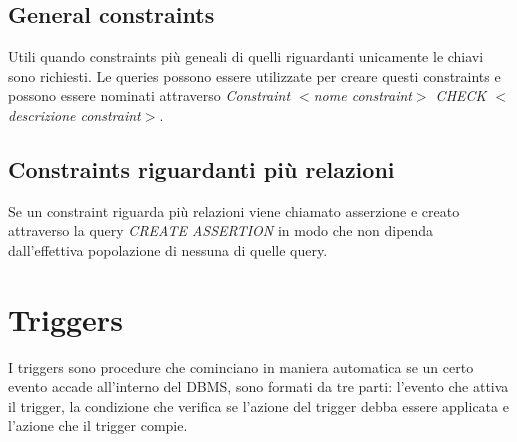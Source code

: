 \subsection{General constraints}
Utili quando constraints pi\`u geneali di quelli riguardanti unicamente le chiavi sono richiesti. Le queries possono essere utilizzate per creare questi
constraints e possono essere nominati attraverso \emph{Constraint $<$nome constraint$>$ CHECK $<$descrizione constraint$>$}.
\subsection{Constraints riguardanti pi\`u relazioni}
Se un constraint riguarda pi\`u relazioni viene chiamato asserzione e creato attraverso la query \emph{CREATE ASSERTION} in modo che non dipenda dall'effettiva popolazione di nessuna di quelle query. 
\section{Triggers}
I triggers sono procedure che cominciano in maniera automatica se un certo evento accade all'interno del DBMS, sono formati da tre parti: l'evento che
attiva il trigger, la condizione che verifica se l'azione del trigger debba essere applicata e l'azione che il trigger compie. 